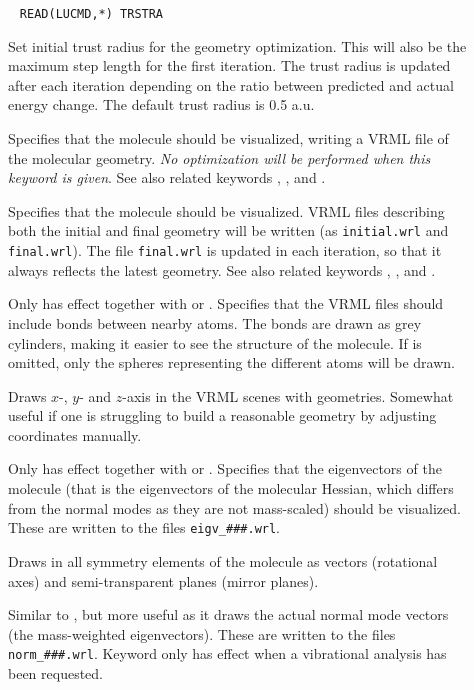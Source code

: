 \begin{description}
\item[]\verb| | \newline
\verb|READ(LUCMD,*) TRSTRA|

Set initial trust radius for the geometry optimization. This
will also be the
maximum step length for the first iteration. The trust radius is
updated after each iteration depending on the ratio between predicted
and actual energy change. The default trust radius is 0.5 a.u.

\item[]
Specifies that the molecule should be
visualized,
writing a VRML file of the molecular geometry. {\em{No optimization
will be performed when this keyword is given}}. See also related
keywords , ,  and .

\item[]
Specifies that the molecule should be
visualized. VRML files describing
both the initial and final geometry
will be written (as \verb|initial.wrl| and \verb|final.wrl|). The file
\verb|final.wrl| is  updated in each iteration, so that it always
reflects the latest geometry. See also related keywords ,
,  and .

\item[]
Only has effect together with  or . Specifies
that the VRML files should include bonds between nearby
atoms. The
bonds are drawn as grey cylinders, making it easier to see the
structure of the molecule. If  is omitted, only the
spheres representing the different atoms will be drawn.

\item[]
Draws $x$-, $y$- and $z$-axis in the VRML scenes with
geometries. Somewhat useful if one is struggling to build a reasonable
geometry by adjusting coordinates manually.

\item[]
Only has effect together with  or
.
Specifies that the eigenvectors of the molecule (that is the
eigenvectors of the molecular Hessian, which differs from the normal modes as
they are not mass-scaled) should be visualized. These are written to
the files \verb|eigv_###.wrl|.

\item[]
Draws in all symmetry elements of the molecule as vectors (rotational
axes) and semi-transparent planes (mirror planes).

\item[]
Similar to , but more useful as it draws the actual normal
mode vectors (the mass-weighted eigenvectors). These are written to
the files \verb|norm_###.wrl|. Keyword only has effect when a
vibrational analysis has been requested.

\end{description}


